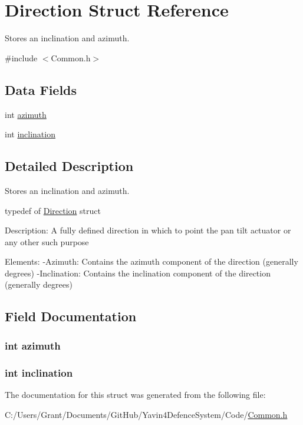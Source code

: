\hypertarget{structDirection}{\section{Direction Struct Reference}
\label{structDirection}
}


Stores an inclination and azimuth.  




{\ttfamily \#include $<$Common.\+h$>$}

\subsection*{Data Fields}
\begin{DoxyCompactItemize}
\item 
int \hyperlink{structDirection_a866e78e12cb32dcaf1ded89bda8be8f5}{azimuth}
\item 
int \hyperlink{structDirection_af308b9934394c8bcf7614eb1df2d863f}{inclination}
\end{DoxyCompactItemize}


\subsection{Detailed Description}
Stores an inclination and azimuth. 



 typedef of \hyperlink{structDirection}{Direction} struct

Description\+: A fully defined direction in which to point the pan tilt actuator or any other such purpose

Elements\+: -\/\+Azimuth\+: Contains the azimuth component of the direction (generally degrees) -\/\+Inclination\+: Contains the inclination component of the direction (generally degrees) 

\subsection{Field Documentation}
\hypertarget{structDirection_a866e78e12cb32dcaf1ded89bda8be8f5}{
\subsubsection[{azimuth}]{\setlength{\rightskip}{0pt plus 5cm}int azimuth}}\label{structDirection_a866e78e12cb32dcaf1ded89bda8be8f5}
\hypertarget{structDirection_af308b9934394c8bcf7614eb1df2d863f}{
\subsubsection[{inclination}]{\setlength{\rightskip}{0pt plus 5cm}int inclination}}\label{structDirection_af308b9934394c8bcf7614eb1df2d863f}


The documentation for this struct was generated from the following file\+:\begin{DoxyCompactItemize}
\item 
C\+:/\+Users/\+Grant/\+Documents/\+Git\+Hub/\+Yavin4\+Defence\+System/\+Code/\hyperlink{Common_8h}{Common.\+h}\end{DoxyCompactItemize}
